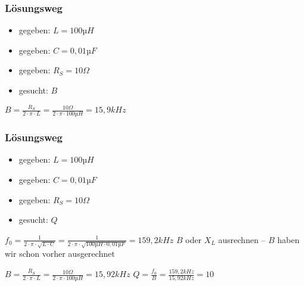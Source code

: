 \begin{frame}
\frametitle{Lösungsweg}
\begin{itemize}
  \item gegeben: $L = 100µH$
  \item gegeben: $C = 0,01µF$
  \item gegeben: $R_S = 10Ω$
  \item gesucht: $B$
  \end{itemize}
    \pause
    $B = \frac{R_S}{2\cdot \pi \cdot L} = \frac{10Ω}{2\cdot \pi \cdot 100µH} = 15,9kHz$



\end{frame}

\begin{frame}
\end{frame}

\begin{frame}
\frametitle{Lösungsweg}
\begin{itemize}
  \item gegeben: $L = 100µH$
  \item gegeben: $C = 0,01µF$
  \item gegeben: $R_S = 10Ω$
  \item gesucht: $Q$
  \end{itemize}
    \pause
    $f_0 = \frac{1}{2 \cdot \pi \cdot \sqrt{L \cdot C}} = \frac{1}{2 \cdot \pi \cdot \sqrt{100µH \cdot 0,01µF}} = 159,2kHz$
    \pause
    $B$ oder $X_L$ ausrechnen – $B$ haben wir schon vorher ausgerechnet

$B = \frac{R_S}{2\cdot \pi \cdot L} = \frac{10Ω}{2\cdot \pi \cdot 100µH} = 15,92kHz$
    \pause
    $Q = \frac{f_0}{B} = \frac{159,2kHz}{15,92kHz} = 10$



\end{frame}

